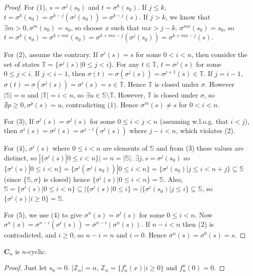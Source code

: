 \documentclass[5p, twocolumn]{elsarticle}
\begin{document}
\begin{proof}
For (1), $s=\sigma^j(s_0)$ and  $t=\sigma^k(s_0)$. If $j\leq k$, $t=\sigma^k(s_0)=\sigma^{k-j}(\sigma^j(s_0))=\sigma^{k-j}(s)$. If $j>k$, we know that 
$\exists m>0, \sigma^m(s_0)=s_0$, so choose $x$ such that $mx>j-k$. $\sigma^{mx}(s_0)=s_0$, so $t=\sigma^k(s_0)=\sigma^{k+mx}(s_0)=\sigma^{k+mx-j}(\sigma^j(s_0))=\sigma^{k+mx-j}(s)$.

For (2), assume the contrary. If $\sigma^i(s)=s$ for some $0<i<n$, then consider the set of states $\mathbb{T}=\{\sigma^j(s)|0\leq j<i\}$. For any $t\in \mathbb{T}$, $t=\sigma^j(s)$ for some $0\leq j<i$. If $j<i-1$, then $\sigma(t)=\sigma(\sigma^j(s))=\sigma^{j+1}(s)\in\mathbb{T}$. If $j=i-1$, $\sigma(t)=\sigma(\sigma^j(s))=\sigma^i(s)=s\in\mathbb{T}$. Hence $\mathbb{T}$ is closed under $\sigma$. However $|\mathbb{S}|=n$ and $|\mathbb{T}|=i<n$, so $\exists u\in\mathbb{S}\setminus\mathbb{T}$. However, $\mathbb{T}$ is closed under $\sigma$, so $\nexists p\geq 0, \sigma^p(s)=u$, contradicting (1). Hence $\sigma^m(s)\neq s$ for $0<i<n$.

For (3), If $\sigma^i(s)=\sigma^j(s)$ for some $0\leq i<j<n$ (assuming w.l.o.g. that $i<j$), then $\sigma^i(s)=\sigma^j(s)=\sigma^{j-i}(\sigma^i(s))$ where $j-i<n$, which violates (2).

For (4), $\sigma^i(s)$ where $0\leq i<n$ are elements of $\mathbb{S}$ and from (3) these values are distinct, so $|\{\sigma^i(s)|0\leq i<n\}|=n=|\mathbb{S}|$. $\exists j, s=\sigma^j(s_0)$ so $\{\sigma^i(s)|0\leq i<n\}=\{\sigma^i(\sigma^j(s_0))|0\leq i<n\}=\{\sigma^i(s_0)|j\leq i<n+j\}\subseteq\mathbb{S}$ (since \{$\mathbb{S},\sigma\}$ is closed) hence $\{\sigma^i(s)|0\leq i<n\}=\mathbb{S}$. Also, $\mathbb{S}=\{\sigma^i(s)|0\leq i<n\}\subseteq|\{\sigma^i(s)|0\leq i\}=|\{\sigma^i(s_0)|j\leq i\}\subseteq\mathbb{S}$, so $\{\sigma^i(s)|i\geq 0\}=\mathbb{S}$.

For (5), we use (4) to give $\sigma^n(s)=\sigma^i(s)$ for some $0\leq i<n$. Now $\sigma^n(s)=\sigma^{n-i}(\sigma^i(s))=\sigma^{n-i}(\sigma^n(s))$. If $n-i<n$ then (2) is contradicted, and $i \geq 0$, so $n-i=n$ and $i=0$. Hence $\sigma^n(s)=\sigma^0(s)=s$.
\end{proof}

\begin{lemma}
$\mathbf{C}_n$ is $n$-cyclic.
\label{cn_cyclic}
\end{lemma}

\begin{proof}
Just let $s_0=0$. $|\mathbb{Z}_n|=n$, $\mathbb{Z}_n=\{f_n^i(x)|i\geq 0\}$ and $f_n^n(0)=0$.
\end{proof}
\end{document}
